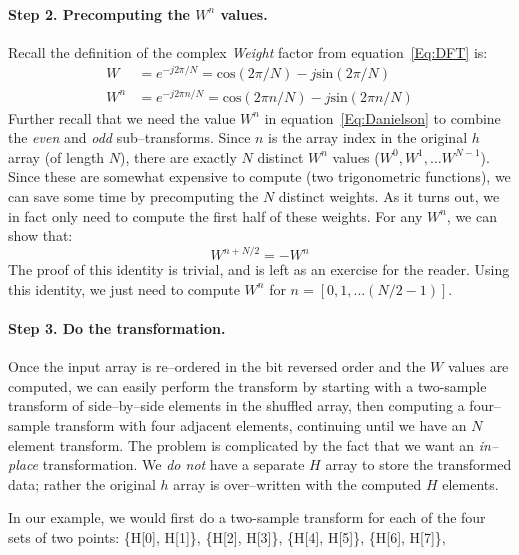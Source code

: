 \documentclass[10pt]{article}
\begin{document}
\paragraph{Step 2.  Precomputing the $W^n$ values.}

Recall the definition of the complex {\em Weight} factor from
equation~\ref{Eq:DFT} is:
\begin{equation}
\label{Eq:W}
\begin{aligned}
W   & = e^{-j2\pi/N} = \mbox{cos}(2\pi/N)-j\mbox{sin}(2\pi/N) \\
W^n & = e^{-j2\pi n/N} = \mbox{cos}(2\pi n/N)-j\mbox{sin}(2\pi n/N)
\end{aligned}
\end{equation}
Further recall that we need the value $W^n$ in equation~\ref{Eq:Danielson}
to combine the {\em even} and {\em odd} sub--transforms.  Since $n$
is the array index in the original $h$ array (of length $N$), there are
exactly $N$ distinct $W^n$ values ($W^0, W^1, \ldots W^{N-1}$).  Since these
are somewhat expensive to compute (two trigonometric functions), we can
save some time by precomputing the $N$ distinct weights. As it turns
out, we in fact only need to compute the first half of these weights.
For any $W^n$, we can show that:
\begin{equation}
W^{n + N/2} = -W^n
\end{equation}
The proof of this identity is trivial, and is left as an exercise for
the reader.  Using this identity, we just need to compute $W^n$ for
$n = [0, 1, \ldots (N/2-1)]$.

\paragraph{Step 3.  Do the transformation.}
Once the input array is re--ordered in the bit reversed order and the
$W$ values are computed, we can easily perform the transform by
starting with a two-sample transform of side--by--side elements
in the shuffled array, then computing a four--sample transform with
four adjacent elements, continuing until we have an $N$ element
transform.  The problem is complicated by the fact that we want
an {\em in--place} transformation.  We {\em do not} have a separate
$H$ array to store the transformed data; rather the original $h$
array is over--written with the computed $H$ elements.
 
In our example, we would first do a two-sample transform for each of the
four sets of two points:
 \{H[0], H[1]\}, \{H[2], H[3]\}, \{H[4], H[5]\}, \{H[6], H[7]\}, 
\end{document}
